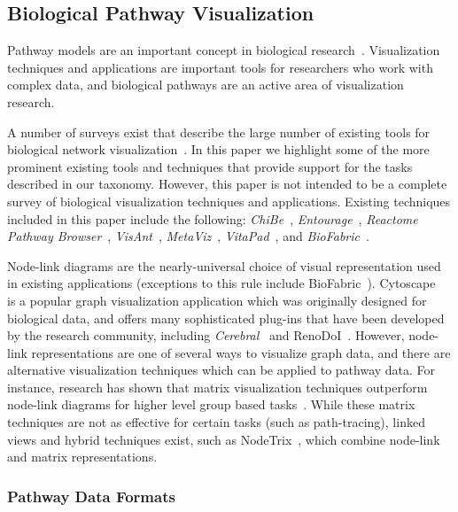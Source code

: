 \documentclass[twocolumn]{bmcart}%
\begin{document}
\subsection*{Biological Pathway Visualization}

Pathway models are an important concept in biological research~\cite{cairns2011regulation, luo2003targeting, reya2001stem}.
Visualization techniques and applications are important tools for researchers who work with complex data, and biological pathways are an active area of visualization research.

A number of surveys exist that describe the large number of existing tools for biological network visualization~\cite{Suderman2007tools,pavlopoulos2008survey,Gehlenborg2010omics}.
In this paper we highlight some of the more prominent existing tools and techniques that provide support for the tasks described in our taxonomy.
However, this paper is not intended to be a complete survey of biological visualization techniques and applications.
Existing techniques included in this paper include the following: \textit{ChiBe}~\cite{Babur2010chibe}, \textit{Entourage}~\cite{Lex2013entourage}, \textit{Reactome Pathway Browser}~\cite{croft2014reactome}, \textit{VisAnt}~\cite{hu2004visant}, \textit{MetaViz}~\cite{bourqui2007metabolic}, \textit{VitaPad}~\cite{holford2005vitapad}, and \textit{BioFabric}~\cite{Longabaugh2012biofabric}.

Node-link diagrams are the nearly-universal choice of visual representation used in existing applications (exceptions to this rule include BioFabric~\cite{Longabaugh2012biofabric}).
Cytoscape~\cite{Shannon2003cytoscape} is a popular graph visualization application which was originally designed for biological data, and offers many sophisticated plug-ins that have been developed by the research community, including \textit{Cerebral}~\cite{Barsky2008cerebral} and RenoDoI~\cite{Vehlow2015}.
However, node-link representations are one of several ways to visualize graph data, and there are alternative visualization techniques which can be applied to pathway data.
For instance, research has shown that matrix visualization techniques outperform node-link diagrams for higher level group based tasks~\cite{Ghoniem2004,Henry2007}.
While these matrix techniques are not as effective for certain tasks (such as path-tracing), linked views and hybrid techniques exist, such as NodeTrix~\cite{NodeTrix2007}, which combine node-link and matrix representations.

\subsubsection*{Pathway Data Formats}
\end{document}
